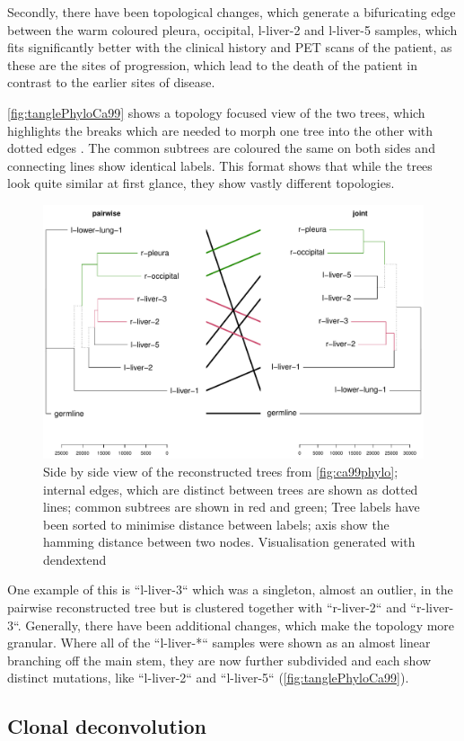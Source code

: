 Secondly, there have been topological changes, which generate a bifuricating edge between the warm coloured pleura, occipital, l-liver-2 and l-liver-5 samples, which fits significantly better with the clinical history and PET scans of the patient, as these are the sites of progression, which lead to the death of the patient in contrast to the earlier sites of disease.

\autoref{fig:tanglePhyloCa99} shows a topology focused view of the two trees, which highlights the breaks which are needed to morph one tree into the other with dotted edges \cite{Vienne2018}. The common subtrees are coloured the same on both sides and connecting lines show identical labels. This format shows that while the trees look quite similar at first glance, they show vastly different topologies.

\begin{figure}[!ht]
\centering
\includegraphics[width=.99\linewidth]{Figures/tanglePhyloCA99.pdf}
\caption[Tanglegram of the reconstructed phylogenies]{Side by side view of the reconstructed trees from \autoref{fig:ca99phylo}; internal edges, which are distinct between trees are shown as dotted lines; common subtrees are shown in red and green; Tree labels have been sorted to minimise distance between labels; axis show the hamming distance between two nodes. Visualisation generated with dendextend \cite{Galili2015}}\label{fig:tanglePhyloCa99}
\end{figure}

One example of this is ``l-liver-3`` which was a singleton, almost an outlier, in the pairwise reconstructed tree but is clustered together with ``r-liver-2`` and ``r-liver-3``. Generally, there have been additional changes, which make the topology more granular. Where all of the ``l-liver-*`` samples were shown as an almost linear branching off the main stem, they are now further subdivided and each show distinct mutations, like ``l-liver-2`` and ``l-liver-5`` (\autoref{fig:tanglePhyloCa99}).



\subsection[Clonal deconvolution]{Clonal deconvolution}
\label{variantcalling-sec:clonal}

